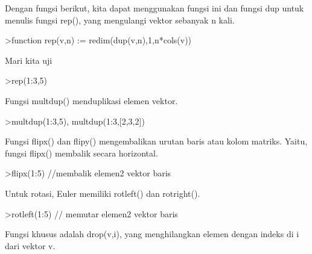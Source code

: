 \documentclass{article}
\begin{document}
\begin{eulernotebook}
\begin{eulercomment}
\begin{eulercomment}
\begin{eulercomment}
\begin{eulercomment}
\begin{eulercomment}
\begin{eulercomment}
\begin{eulercomment}
Dengan fungsi berikut, kita dapat menggunakan fungsi ini dan fungsi
dup untuk menulis fungsi rep(), yang mengulangi vektor sebanyak n
kali.
\end{eulercomment}
\begin{eulerprompt}
>function rep(v,n) := redim(dup(v,n),1,n*cols(v))
\end{eulerprompt}
\begin{eulercomment}
Mari kita uji
\end{eulercomment}
\begin{eulerprompt}
>rep(1:3,5)
\end{eulerprompt}
\begin{euleroutput}
  [1,  2,  3,  1,  2,  3,  1,  2,  3,  1,  2,  3,  1,  2,  3]
\end{euleroutput}
\begin{eulercomment}
Fungsi multdup() menduplikasi elemen vektor.
\end{eulercomment}
\begin{eulerprompt}
>multdup(1:3,5), multdup(1:3,[2,3,2])
\end{eulerprompt}
\begin{euleroutput}
  [1,  1,  1,  1,  1,  2,  2,  2,  2,  2,  3,  3,  3,  3,  3]
  [1,  1,  2,  2,  2,  3,  3]
\end{euleroutput}
\begin{eulercomment}
Fungsi flipx() dan flipy() mengembalikan urutan baris atau kolom
matriks. Yaitu, fungsi flipx() membalik secara horizontal.
\end{eulercomment}
\begin{eulerprompt}
>flipx(1:5) //membalik elemen2 vektor baris
\end{eulerprompt}
\begin{euleroutput}
  [5,  4,  3,  2,  1]
\end{euleroutput}
\begin{eulercomment}
Untuk rotasi, Euler memiliki rotleft() dan rotright().
\end{eulercomment}
\begin{eulerprompt}
>rotleft(1:5) // memutar elemen2 vektor baris
\end{eulerprompt}
\begin{euleroutput}
  [2,  3,  4,  5,  1]
\end{euleroutput}
\begin{eulercomment}
Fungsi khusus adalah drop(v,i), yang menghilangkan elemen dengan
indeks di i dari vektor v.
\end{eulercomment}
\begin{eulerprompt}

\end{eulerprompt}
\end{eulercomment}
\end{eulercomment}
\end{eulercomment}
\end{eulercomment}
\end{eulercomment}
\end{eulercomment}
\end{eulernotebook}
\end{document}
